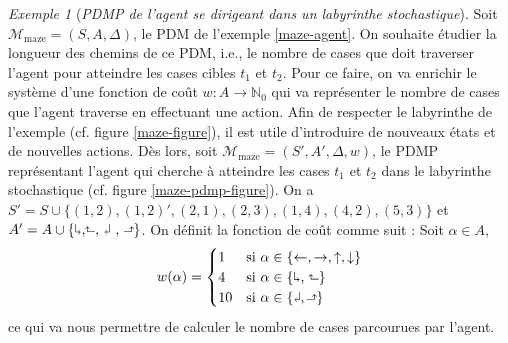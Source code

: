 \documentclass[12pt,a4paper]{report}
\theoremstyle{definition}%
\theoremstyle{remark}
\newtheorem{example}{Exemple}[chapter]
\begin{document}
\begin{example}[\textit{PDMP de l'agent se dirigeant dans un labyrinthe
stochastique}]\label{maze-pdmp}
	Soit $\mathcal{M}_{\text{maze}} = (S, A, \Delta)$, le PDM de l'exemple
	\ref{maze-agent}. On souhaite étudier la longueur des chemins de ce PDM,
	i.e., le nombre de cases que doit traverser l'agent pour atteindre les cases
	cibles $t_1$ et $t_2$. Pour ce faire, on va enrichir le système d'une
	fonction de coût $w : A \rightarrow \mathbb{N}_0$ qui va représenter le
	nombre de cases que l'agent traverse en effectuant une action. Afin
	de respecter le labyrinthe de l'exemple (cf. figure \ref{maze-figure}),
	il est utile d'introduire de nouveaux états et de nouvelles actions.
	Dès lors, soit $\mathcal{M}_{\text{maze}} = (S', A', \Delta, w)$, le PDMP
	représentant l'agent qui cherche à atteindre les cases $t_1$ et $t_2$ dans
	le labyrinthe stochastique (cf. figure \ref{maze-pdmp-figure}).
	On a $S' = S \cup \{(1, 2), (1, 2)', (2, 1), (2, 3), (1, 4), (4, 2), (5, 3) \}$ et
	$A' = A \cup \{\text{\rotatebox[origin=c]{180}{$\Lsh$},\rotatebox[origin=c]{90}{$\Rsh$},
	\rotatebox[origin=c]{180}{$\Rsh$} , \rotatebox[origin=c]{270}{$\Lsh$}}\}$.
On définit la fonction de coût comme suit : Soit $\alpha \in A$,
\[ w(\alpha) =
	\begin{cases}
		1 & \text{si } \alpha \in \{\leftarrow, \rightarrow, \uparrow, \downarrow\} \\
		4 & \text{si } \alpha \in \{
		\text{\rotatebox[origin=c]{180}{$\Lsh$},
		\rotatebox[origin=c]{90}{$\Rsh$}}\} \\
		10 & \text{si } \alpha \in \{ \rotatebox[origin=c]{180}{$\Rsh$} , \rotatebox[origin=c]{270}{$\Lsh$}\}
	\end{cases}
\]
ce qui va nous permettre de calculer le nombre de cases parcourues par l'agent.
	\begin{figure}[H]
		\centering
		\captionsetup{justification=centering}

\end{figure}
\end{example}
\end{document}

